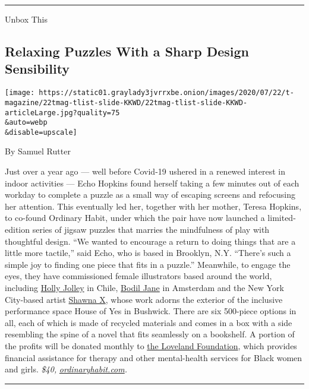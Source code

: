 \begin{center}\rule{0.5\linewidth}{\linethickness}\end{center}

Unbox This

\hypertarget{relaxing-puzzles-with-a-sharp-design-sensibility}{%
\subsection{Relaxing Puzzles With a Sharp Design
Sensibility}\label{relaxing-puzzles-with-a-sharp-design-sensibility}}

\texttt{[image: https://static01.graylady3jvrrxbe.onion/images/2020/07/22/t-magazine/22tmag-tlist-slide-KKWD/22tmag-tlist-slide-KKWD-articleLarge.jpg?quality=75\\\&auto=webp\\\&disable=upscale]}

By Samuel Rutter

Just over a year ago --- well before Covid-19 ushered in a renewed
interest in indoor activities --- Echo Hopkins found herself taking a
few minutes out of each workday to complete a puzzle as a small way of
escaping screens and refocusing her attention. This eventually led her,
together with her mother, Teresa Hopkins, to co-found Ordinary Habit,
under which the pair have now launched a limited-edition series of
jigsaw puzzles that marries the mindfulness of play with thoughtful
design. ``We wanted to encourage a return to doing things that are a
little more tactile,'' said Echo, who is based in Brooklyn, N.Y.
``There's such a simple joy to finding one piece that fits in a
puzzle.'' Meanwhile, to engage the eyes, they have commissioned female
illustrators based around the world, including
\href{https://www.instagram.com/holly_jolley_/?hl=en}{Holly Jolley} in
Chile, \href{https://www.instagram.com/bodiljane/?hl=en}{Bodil Jane} in
Amsterdam and the New York City-based artist
\href{https://www.instagram.com/shawnax/?hl=en}{Shawna X}, whose work
adorns the exterior of the inclusive performance space House of Yes in
Bushwick. There are six 500-piece options in all, each of which is made
of recycled materials and comes in a box with a side resembling the
spine of a novel that fits seamlessly on a bookshelf. A portion of the
profits will be donated monthly to
\href{https://thelovelandfoundation.org/}{the Loveland Foundation},
which provides financial assistance for therapy and other mental-health
services for Black women and girls. \emph{\$40,}
\href{http://ordinaryhabit.com/}{\emph{ordinaryhabit.com}}\emph{.}

\begin{center}\rule{0.5\linewidth}{\linethickness}\end{center}

